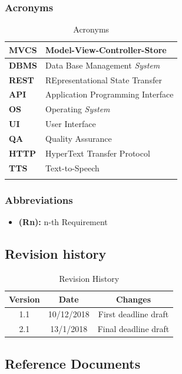 \documentclass[titlepage]{article}
\begin{document}
	
	\subsubsection{Acronyms}
	\renewcommand*{\arraystretch}{1.4}
	\begin{longtable}{| p{2 cm} | p{7 cm} |} \hline
		{\bf MVCS} & Model-View-Controller-Store \\\hline
		{\bf DBMS} & Data Base Management {\it System} \\ \hline
		{\bf REST} & REpresentational State Transfer \\ \hline
		{\bf API} & Application Programming Interface \\ \hline
		{\bf OS} & Operating {\it System}\\ \hline
		{\bf UI} & User Interface \\ \hline
		{\bf QA} & Quality Assurance \\ \hline		
		{\bf HTTP} & HyperText Transfer Protocol \\ \hline	
		{\bf TTS} & Text-to-Speech \\ \hline
		\caption{Acronyms}	
		
	\end{longtable}
	
	\subsubsection{Abbreviations}
	
	\begin{itemize}
		\item {\bf (Rn):} n-th Requirement
	\end{itemize}
	
	
	\subsection{Revision history}
	
	\begin{table}[ht]
		\centering
		\begin{tabular}{ccc} 
			Version & Date & Changes  \\ 
			\hline
			1.1 & 10/12/2018 & First deadline draft \\
			2.1 & 13/1/2018 & Final deadline draft \\
		\end{tabular}
		\caption{Revision History}
		\label{default}
	\end{table}
	
	
	\subsection{Reference Documents}
	
\end{document}
